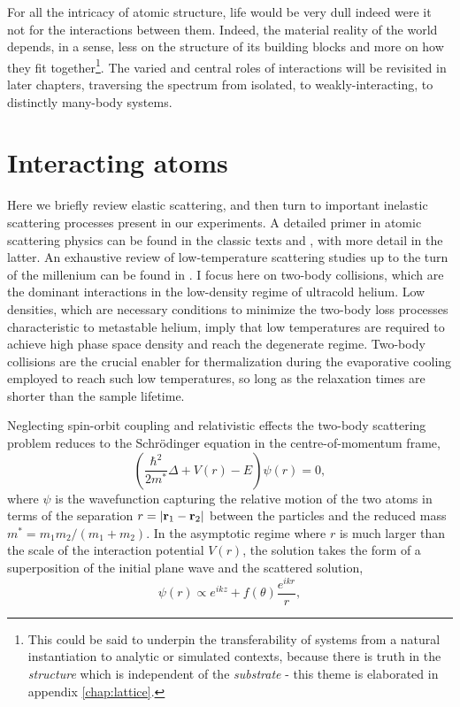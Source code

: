 	
	For all the intricacy of atomic structure, life would be very dull indeed were it not for the interactions between them.
	Indeed, the material reality of the world depends, in a sense, less on the structure of its building blocks and more on how they fit together\footnote{This could be said to underpin the transferability of systems from a natural instantiation to analytic or simulated contexts, because there is truth in the \emph{structure} which is independent of the \emph{substrate} - this theme is elaborated in appendix \ref{chap:lattice}.}.
	The varied and central roles of interactions will be revisited in later chapters, traversing the spectrum from isolated, to weakly-interacting, to distinctly many-body systems.
	

\section{Interacting atoms}

	
	Here we briefly review elastic scattering, and then turn to important inelastic scattering processes present in our experiments.
	A detailed primer in atomic scattering physics can be found in the classic texts \cite{PitaevskiiStringari} and \cite{PethickSmith}, with more detail in the latter.
	An exhaustive review of low-temperature scattering studies up to the turn of the millenium can be found in \cite{Weiner99}.
	I focus here on two-body collisions, which are the dominant interactions in the low-density regime of ultracold helium.
	Low densities, which are necessary conditions to minimize the two-body loss processes characteristic to metastable helium, imply that low temperatures are required to achieve high phase space density and reach the degenerate regime.
	Two-body collisions are the crucial enabler for thermalization during the evaporative cooling employed to reach such low temperatures, so long as the relaxation times are shorter than the sample lifetime.

	Neglecting spin-orbit coupling and relativistic effects the two-body scattering problem reduces to the Schr\"{o}dinger equation in the centre-of-momentum frame,
	\begin{equation}
	\left(\frac{\hbar^2}{2m^*}\Delta + V(r) - E\right)\psi(r) = 0,
	\end{equation}
	where $\psi$ is the wavefunction capturing the relative motion of the two atoms	in terms of the separation $r=|\textbf{r}_1-\textbf{r}_2|$ between the particles and the reduced mass $m^*=m_1m_2/(m_1+m_2)$.
	In the asymptotic regime where $r$ is much larger than the scale of the interaction potential $V(r)$, the solution takes the form of a superposition of the initial plane wave and the scattered solution,
	\begin{equation}
	\psi(r) \propto e^{ikz} + f(\theta)\frac{e^{ikr}}{r},
	\end{equation}


